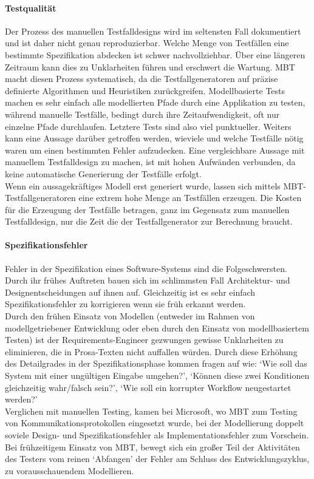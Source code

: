 \paragraph{Testqualität} Der Prozess des manuellen Testfalldesigns wird im seltensten Fall dokumentiert und ist daher nicht genau reproduzierbar. Welche Menge von Testfällen eine bestimmte Spezifikation abdecken ist schwer nachvollziehbar. Über eine längeren Zeitraum kann dies zu Unklarheiten führen und erschwert die Wartung\cite{utting_practical_2007}. \Gls{MBT} macht diesen Prozess systematisch, da die Testfallgeneratoren auf präzise definierte Algorithmen und Heuristiken zurückgreifen. Modellbasierte Tests machen es sehr einfach alle modellierten Pfade durch eine Applikation zu testen, während manuelle Testfälle, bedingt durch ihre Zeitaufwendigkeit, oft nur einzelne Pfade durchlaufen. Letztere Tests sind also viel punktueller. Weiters kann eine Aussage darüber getroffen werden, wieviele und welche Testfälle nötig waren um einen bestimmten Fehler aufzudecken. Eine vergleichbare Aussage mit manuellem Testfalldesign zu machen, ist mit hohen Aufwänden verbunden, da keine automatische Generierung der Testfälle erfolgt.\\
Wenn ein aussagekräftiges Modell erst generiert wurde, lassen sich mittels MBT-Testfallgeneratoren eine extrem hohe Menge an Testfällen erzeugen. Die Kosten für die Erzeugung der Testfälle betragen, ganz im Gegensatz zum manuellen Testfalldesign, nur die Zeit die der Testfallgenerator zur Berechnung braucht.

\paragraph{Spezifikationsfehler}
Fehler in der Spezifikation eines Software-Systems sind die Folgeschwersten\cite{utting_practical_2007}. Durch ihr frühes Auftreten bauen sich im schlimmsten Fall Architektur- und Designentscheidungen auf ihnen auf. Gleichzeitig ist es sehr einfach Spezifikationsfehler zu korrigieren wenn sie früh erkannt werden.\\
Durch den frühen Einsatz von Modellen (entweder im Rahmen von modellgetriebener Entwicklung oder eben durch den Einsatz von modellbasiertem Testen) ist der Requirements-Engineer gezwungen gewisse Unklarheiten zu eliminieren, die in Prosa-Texten nicht auffallen würden. Durch diese Erhöhung des Detailgrades in der Spezifikationsphase kommen fragen auf wie: `Wie soll das System mit einer ungültigen Eingabe umgehen?', `Können diese zwei Konditionen gleichzeitig wahr/falsch sein?', `Wie soll ein korrupter Workflow neugestartet werden?'\\
Verglichen mit manuellen Testing, kamen bei Microsoft, wo \Gls{MBT} zum Testing von Kommunikationsprotokollen eingesetzt wurde,  bei der Modellierung doppelt soviele Design- und Spezifikationsfehler als Implementationsfehler zum Vorschein\cite{stobie_model_2005}. Bei frühzeitigem Einsatz von MBT, bewegt sich ein großer Teil der Aktivitäten des Testers vom reinen `Abfangen' der Fehler am Schluss des Entwicklungszyklus, zu vorausschauendem Modellieren.

